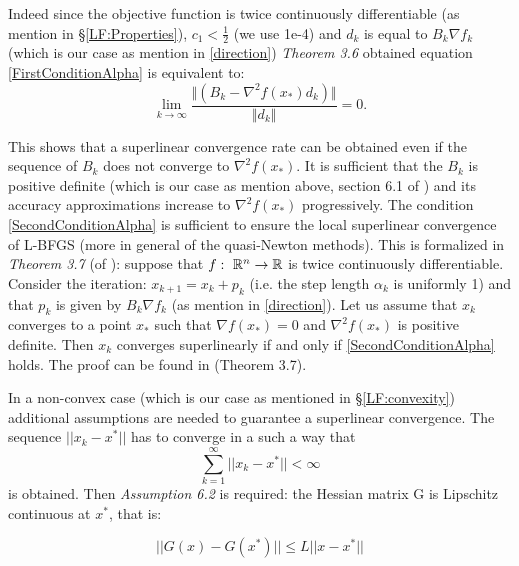  Indeed since the objective function is twice continuously differentiable (as mention in \S \ref{LF:Properties}), $c_{1}<\frac{1}{2}$ (we use 1e-4) and $d_{k}$ is equal to $B_{k}\nabla f_{k}$ (which is our case as mention in \ref{direction}) \textit{Theorem 3.6} obtained equation \ref{FirstConditionAlpha} is equivalent to: 
\begin{equation}
\label{SecondConditionAlpha}
 \lim_{k\to\infty}\frac{\Vert (B_{k} - \nabla^2f(x_*) d_{k})\Vert}{\Vert d_{k} \Vert} = 0.
\end{equation}

This shows that a superlinear convergence rate can be obtained even if the sequence of $B_{k}$ does not converge to $\nabla^2f(x_*)$. It is sufficient that the $B_{k}$ is positive definite (which is our case as mention above, section 6.1 of \cite{numerical}) and its accuracy approximations increase to $\nabla^2f(x_*)$ progressively. The condition \ref{SecondConditionAlpha} is sufficient to ensure the local superlinear convergence of L-BFGS (more in general of the quasi-Newton methods). This is formalized in \textit{Theorem 3.7} (of \cite{numerical}):
suppose that $f: \textnormal{ }\mathbb{R}^n \rightarrow \mathbb{R}$ is twice continuously differentiable. Consider the iteration: $x_{k+1}=x_{k} + p_{k}$ (i.e. the step length $\alpha_{k}$ is uniformly 1) and that $p_{k}$ is given by $B_{k}\nabla f_{k}$ (as mention in \ref{direction}). Let us assume that $x_{k}$ converges to a point $x_{*}$ such that $\nabla f(x_{*}) = 0$ and $\nabla^2f(x_{*})$ is positive definite. Then $x_{k}$ converges superlinearly if and only if \ref{SecondConditionAlpha} holds. The proof can be found in \cite{numerical} (Theorem 3.7). 

In a non-convex case (which is our case as mentioned in \S \ref{LF:convexity}) additional assumptions are needed to guarantee a superlinear convergence. The sequence $|| x_{k} - x^* ||$ has to converge in a such a way that 
\begin{equation}
\label{eq:convergence-sequence}
\sum_{k=1}^{\infty}|| x_{k} - x^* ||<\infty
\end{equation}
is obtained. Then \textit{Assumption 6.2} is required: the Hessian matrix G is Lipschitz continuous at $x^*$, that is: 

\begin{equation}
|| G(x)-G(x^*)  || \le L || x - x^*||
\end{equation}

